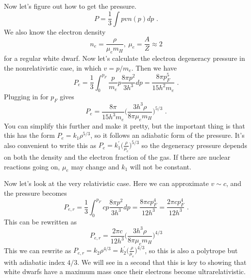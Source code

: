 \begin{enumerate}
      Now let's figure out how to get the pressure. %
      \begin{equation}
      P = \frac{1}{3} \int p v n(p) dp\,\,.
      \end{equation}
      We also know the electron density
      \begin{equation}
      n_e = \frac{\rho}{\mu_e m_H},~\mu_e = \frac{A}{Z} \approx 2
      \end{equation}
      for a regular white dwarf. Now let's calculate the electron degeneracy pressure in the nonrelativistic case, in which $v = p/m_e$. Then we have
      \begin{equation}
      P_e = \frac{1}{3} \int^{p_F}_0 \frac{p}{m_e} p \frac{8 \pi p^2}{3 h^3} dp = \frac{8 \pi p_F^5}{15 h^2 m_e}\,\,.
      \end{equation}
      Plugging in for $p_F$ gives
      \begin{equation}
      P_e = \frac{8\pi}{15 h^3 m_e} \biggl( \frac{3 h^3 \rho}{8 \pi\mu_e m_H}\biggr)^{5/3}\,\,.
      \end{equation}
      You can simplify this further and make it pretty, but the important thing is that this has the form $P_e = k_1 \rho^{5/3}$, so it follows an adiabatic form of the pressure. It's also convenient to write this as $P_e = k_1^\prime \biggl( \frac{\rho}{\mu_e} \biggr)^{5/3}$ so the degeneracy pressure depends on both the density and the electron fraction of the gas. If there are nuclear reactions going on, $\mu_e$ may change and $k_1$ will not be constant.
      
      Now let's look at the very relativistic case. Here we can approximate $v \sim c$, and the pressure becomes
      \begin{equation}
      P_{e,r} = \frac{1}{3} \int^{p_F}_0 c p \frac{8 \pi p^2}{3 h^3} dp = \frac{8\pi c p_F^4}{12 h^3} = \frac{2\pi c p_F^4}{12 h^3}\,\,.
      \end{equation}
      This can be rewritten as
      \begin{equation}
      P_{e,r} = \frac{2\pi c}{12 h^3} \biggl( \frac{3 h^3 \rho}{8 \pi\mu_e m_H} \biggr)^{4/3}
      \end{equation}
      This we can rewrite as $P_{e,r} = k_2 \rho^{4/3} = k_2^\prime \biggl(\frac{\rho}{\mu_e}\biggr)^{4/3}$, so this is also a polytrope but with adiabatic index $4/3$. We will see in a second that this is key to showing that white dwarfs have a maximum mass once their electrons become ultrarelativistic.
      

\end{enumerate}
